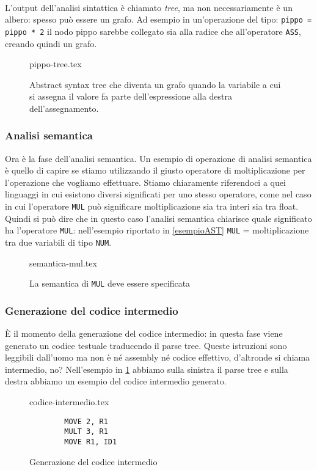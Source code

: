 \documentclass[class=book, crop=false, oneside, 12pt]{standalone}
\begin{document}
\paragraph{}
L'output dell'analisi sintattica è chiamato \emph{tree}, ma non necessariamente è un albero: spesso può essere un grafo. Ad esempio in un'operazione del tipo:
\texttt{pippo = pippo * 2}
il nodo pippo sarebbe collegato sia alla radice che all'operatore \texttt{ASS}, creando quindi un grafo.
\begin{figure}[H]
	\centering
	{pippo-tree.tex}
	\caption{Abstract syntax tree che diventa un grafo quando la variabile a cui si assegna il valore fa parte dell'espressione alla destra dell'assegnamento.}
\end{figure}

\subsubsection{Analisi semantica}
Ora è la fase dell'analisi semantica. Un esempio di operazione di analisi semantica è quello di capire se stiamo utilizzando il giusto operatore di moltiplicazione per l'operazione che vogliamo effettuare. Stiamo chiaramente riferendoci a quei linguaggi in cui esistono diversi significati per uno stesso operatore, come nel caso in cui l'operatore \texttt{MUL} può significare moltiplicazione sia tra interi sia tra float. Quindi si può dire che in questo caso l'analisi semantica chiarisce quale significato ha l'operatore \texttt{MUL}: nell'esempio riportato in \ref{esempioAST} \texttt{MUL} = moltiplicazione tra due variabili di tipo \texttt{NUM}.
\begin{figure}[H]
	\centering
	{semantica-mul.tex}
	\caption{La semantica di \texttt{MUL} deve essere specificata}
\end{figure}

\subsubsection{Generazione del codice intermedio}
È il momento della generazione del codice intermedio: in questa fase viene generato un codice testuale traducendo il parse tree. Queste istruzioni sono leggibili dall'uomo ma non è né assembly né codice effettivo, d'altronde si chiama intermedio, no? Nell'esempio in \ref{codice_intermedio} abbiamo sulla sinistra il parse tree e sulla destra abbiamo un esempio del codice intermedio generato.
\begin{figure}[H]
    \begin{minipage}{.5\textwidth}
		\raggedleft
		{codice-intermedio.tex}
	\end{minipage}
	\begin{minipage}{.5\textwidth}
		\raggedright
		\begin{verbatim}
		MOVE 2, R1
		MULT 3, R1
		MOVE R1, ID1
		\end{verbatim}
	\end{minipage}
	\caption{Generazione del codice intermedio}
	\label{codice_intermedio}
\end{figure}
\end{document}
